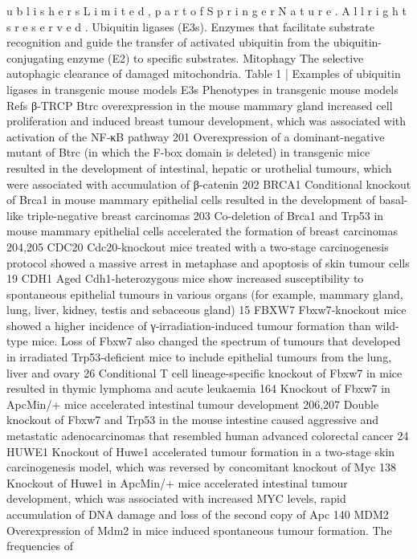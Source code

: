 u
b
l
i
s
h
e
r
s
 L
i
m
i
t
e
d
,
 p
a
r
t
 o
f
 S
p
r
i
n
g
e
r
 N
a
t
u
r
e
.
 A
l
l
 r
i
g
h
t
s
 r
e
s
e
r
v
e
d
.
Ubiquitin ligases
(E3s). Enzymes that facilitate
substrate recognition and
guide the transfer of activated
ubiquitin from the ubiquitin-
conjugating enzyme (E2) to
specific substrates.
Mitophagy
The selective autophagic
clearance of damaged
mitochondria.
Table 1 | Examples of ubiquitin ligases in transgenic mouse models
E3s
Phenotypes in transgenic mouse models
Refs
β-TRCP
Btrc overexpression in the mouse mammary gland increased cell proliferation and induced
breast tumour development, which was associated with activation of the NF‑κB pathway
201
Overexpression of a dominant-negative mutant of Btrc (in which the F-box domain is deleted)
in transgenic mice resulted in the development of intestinal, hepatic or urothelial tumours,
which were associated with accumulation of β‑catenin
202
BRCA1
Conditional knockout of Brca1 in mouse mammary epithelial cells resulted in the development
of basal-like triple-negative breast carcinomas
203
Co‑deletion of Brca1 and Trp53 in mouse mammary epithelial cells accelerated the formation
of breast carcinomas
204,205
CDC20
Cdc20‑knockout mice treated with a two-stage carcinogenesis protocol showed a massive
arrest in metaphase and apoptosis of skin tumour cells
19
CDH1
Aged Cdh1‑heterozygous mice show increased susceptibility to spontaneous epithelial
tumours in various organs (for example, mammary gland, lung, liver, kidney, testis and
sebaceous gland)
15
FBXW7
Fbxw7‑knockout mice showed a higher incidence of γ‑irradiation-induced tumour formation
than wild-type mice. Loss of Fbxw7 also changed the spectrum of tumours that developed in
irradiated Trp53‑deficient mice to include epithelial tumours from the lung, liver and ovary
26
Conditional T cell lineage-specific knockout of Fbxw7 in mice resulted in thymic lymphoma
and acute leukaemia
164
Knockout of Fbxw7 in ApcMin/+ mice accelerated intestinal tumour development
206,207
Double knockout of Fbxw7 and Trp53 in the mouse intestine caused aggressive and metastatic
adenocarcinomas that resembled human advanced colorectal cancer
24
HUWE1
Knockout of Huwe1 accelerated tumour formation in a two-stage skin carcinogenesis model,
which was reversed by concomitant knockout of Myc
138
Knockout of Huwe1 in ApcMin/+ mice accelerated intestinal tumour development, which was
associated with increased MYC levels, rapid accumulation of DNA damage and loss of the
second copy of Apc
140
MDM2
Overexpression of Mdm2 in mice induced spontaneous tumour formation. The frequencies of
